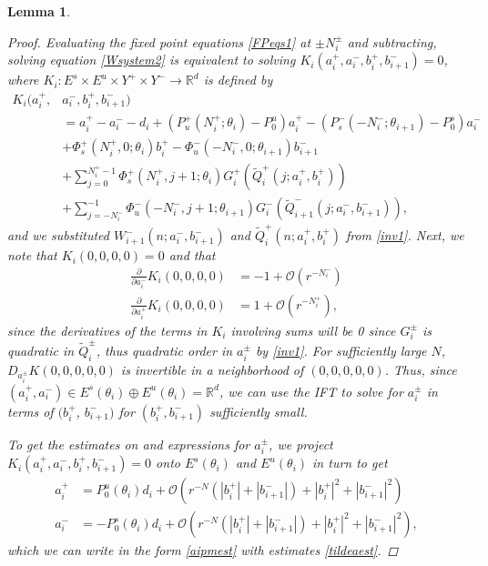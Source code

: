 \documentclass[12pt]{elsarticle}
\def\R{{\mathbb R}}
\newtheorem{lemma}{Lemma}
\begin{document}
\begin{lemma}
\begin{proof}
Evaluating the fixed point equations \cref{FPeqs1} at $\pm N_i^\pm$ and subtracting, solving equation \cref{Wsystem2} is equivalent to solving $K_i(a_i^+, a_i^-, b_i^+, b_{i+1}^-) = 0$, where $K_i: E^s \times E^u \times Y^+ \times Y^- \rightarrow \R^d$ is defined by
\begin{align*}
K_i(a_i^+, &a_i^-, b_i^+, b_{i+1}^-) \\
&= a_i^+ - a_i^- - d_i + (P_u^+(N_i^+; \theta_i) - P_0^u) a_i^+ - (P_s^-(-N_i^-; \theta_{i+1}) - P_0^s) a_i^- \\
&+ \Phi_s^+(N_i^+, 0; \theta_i) b_i^+ - \Phi_u^-(-N_i^-, 0; \theta_{i+1}) b_{i+1}^- \\
&+ \sum_{j = 0}^{N_i^+-1} \Phi_s^+(N_i^+, j+1; \theta_i) G_i^+(\tilde{Q}_i^+(j; a_i^+, b_i^+)) \\
&+ \sum_{j = -N_i^-}^{-1} \Phi_u^-(-N_i^-, j+1; \theta_{i+1}) G_i^-(\tilde{Q}_{i+1}^-(j; a_i^-, b_{i+1}^-)),
\end{align*}
and we substituted $W_{i+1}^-(n; a_i^-, b_{i+1}^-)$ and $\tilde{Q}_i^+(n; a_i^+, b_i^+)$ from \cref{inv1}. Next, we note that $K_i(0,0,0,0) = 0$ and that 
\begin{align*}
\frac{\partial}{\partial a_i^-} K_i(0, 0, 0, 0) &= -1 + \mathcal{O}(r^{-N_i^-}) \\
\frac{\partial}{\partial a_i^+} K_i(0, 0, 0, 0) &= 1 + \mathcal{O}(r^{-N_i^+}),
\end{align*}
since the derivatives of the terms in $K_i$ involving sums will be 0 since $G_i^\pm$ is quadratic in $\tilde{Q}_i^\pm$, thus quadratic order in $a_i^\pm$ by \cref{inv1}. For sufficiently large $N$, $D_{a_i^\pm} K(0, 0, 0, 0, 0)$ is invertible in a neighborhood of $(0, 0, 0, 0, 0)$. Thus, since $(a_i^+, a_i^-) \in E^s(\theta_i) \oplus E^u(\theta_i) = \R^d$, we can use the IFT to solve for $a_i^\pm$ in terms of $(b_i^+$, $b_{i+1}^-)$ for $(b_i^+, b_{i+1}^-)$ sufficiently small.

To get the estimates on and expressions for $a_i^\pm$, we project $K_i(a_i^+, a_i^-, b_i^+, b_{i+1}^-) = 0$ onto $E^s(\theta_i)$ and $E^u(\theta_i)$ in turn to get 
\begin{align*}
a_i^+ &= P_0^u(\theta_i) d_i + \mathcal{O}(r^{-N}(|b_i^+|+|b_{i+1}^-|) + |b_i^+|^2+|b_{i+1}^-|^2) \\
a_i^- &= -P_0^s(\theta_i) d_i + \mathcal{O}(r^{-N}(|b_i^+|+|b_{i+1}^-|) + |b_i^+|^2+|b_{i+1}^-|^2),
\end{align*}
which we can write in the form \cref{aipmest} with estimates \cref{tildeaest}. 


\end{proof}
\end{lemma}
\end{document}
